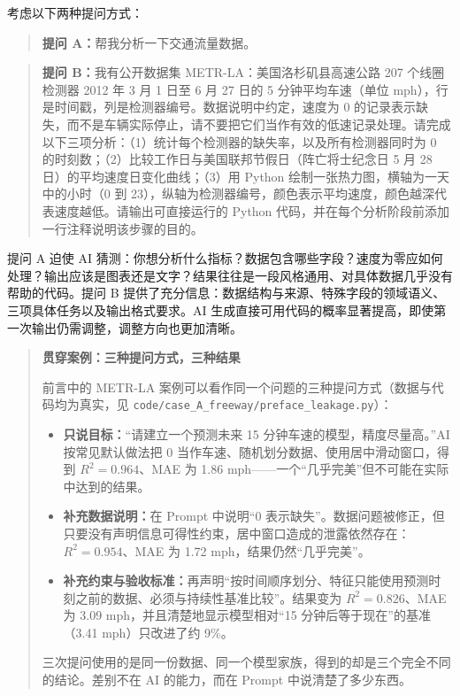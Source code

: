 考虑以下两种提问方式：

\begin{quote}
\textbf{提问 A：}帮我分析一下交通流量数据。
\end{quote}

\begin{quote}
\textbf{提问 B：}我有公开数据集 METR-LA：美国洛杉矶县高速公路 207 个线圈检测器 2012 年 3 月 1 日至 6 月 27 日的 5 分钟平均车速（单位 mph），行是时间戳，列是检测器编号。数据说明中约定，速度为 0 的记录表示缺失，而不是车辆实际停止，请不要把它们当作有效的低速记录处理。请完成以下三项分析：（1）统计每个检测器的缺失率，以及所有检测器同时为 0 的时刻数；（2）比较工作日与美国联邦节假日（阵亡将士纪念日 5 月 28 日）的平均速度日变化曲线；（3）用 Python 绘制一张热力图，横轴为一天中的小时（0 到 23），纵轴为检测器编号，颜色表示平均速度，颜色越深代表速度越低。请输出可直接运行的 Python 代码，并在每个分析阶段前添加一行注释说明该步骤的目的。
\end{quote}

提问 A 迫使 AI 猜测：你想分析什么指标？数据包含哪些字段？速度为零应如何处理？输出应该是图表还是文字？结果往往是一段风格通用、对具体数据几乎没有帮助的代码。提问 B 提供了充分信息：数据结构与来源、特殊字段的领域语义、三项具体任务以及输出格式要求。AI 生成直接可用代码的概率显著提高，即使第一次输出仍需调整，调整方向也更加清晰。

\begin{quote}
\textbf{贯穿案例：三种提问方式，三种结果}

前言中的 METR-LA 案例可以看作同一个问题的三种提问方式（数据与代码均为真实，见 \texttt{code/case\_A\_freeway/preface\_leakage.py}）：

\begin{itemize}
  \item \textbf{只说目标：}“请建立一个预测未来 15 分钟车速的模型，精度尽量高。”AI 按常见默认做法把 0 当作车速、随机划分数据、使用居中滑动窗口，得到 $R^2=0.964$、MAE 为 1.86 mph——一个“几乎完美”但不可能在实际中达到的结果。
  \item \textbf{补充数据说明：}在 Prompt 中说明“0 表示缺失”。数据问题被修正，但只要没有声明信息可得性约束，居中窗口造成的泄露依然存在：$R^2=0.954$、MAE 为 1.72 mph，结果仍然“几乎完美”。
  \item \textbf{补充约束与验收标准：}再声明“按时间顺序划分、特征只能使用预测时刻之前的数据、必须与持续性基准比较”。结果变为 $R^2=0.826$、MAE 为 3.09 mph，并且清楚地显示模型相对“15 分钟后等于现在”的基准（3.41 mph）只改进了约 9\%。
\end{itemize}

三次提问使用的是同一份数据、同一个模型家族，得到的却是三个完全不同的结论。差别不在 AI 的能力，而在 Prompt 中说清楚了多少东西。
\end{quote}

